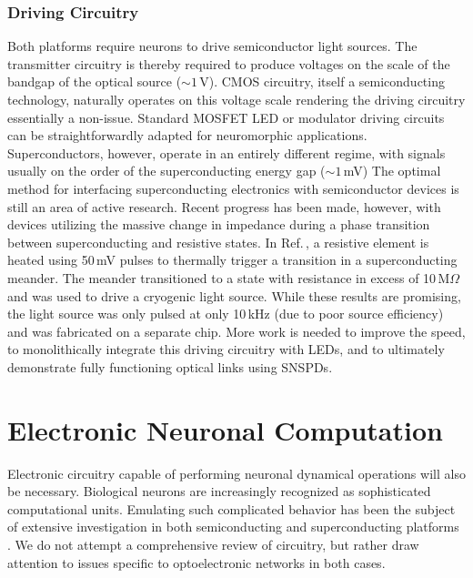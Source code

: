 \documentclass[twocolumn]{article}
\begin{document}
\subsubsection{Driving Circuitry}
Both platforms require neurons to drive semiconductor light sources. The transmitter circuitry is thereby required to produce voltages on the scale of the bandgap of the optical source ($\sim 1$\,V). CMOS circuitry, itself a semiconducting technology, naturally operates on this voltage scale rendering the driving circuitry essentially a non-issue. Standard MOSFET LED or modulator driving circuits \cite{bowers2016recent,LED reference?} can be straightforwardly adapted for neuromorphic applications. Superconductors, however, operate in an entirely different regime, with signals usually on the order of the superconducting energy gap ($\sim 1$\,mV) The optimal method for interfacing superconducting electronics with semiconductor devices is still an area of active research. Recent progress has been made, however, with devices utilizing the massive change in impedance during a phase transition between superconducting and resistive states. In Ref.\,\cite{mccaughan2019superconducting}, a resistive element is heated using 50\,mV pulses to thermally trigger a transition in a superconducting meander. The meander transitioned to a state with resistance in excess of 10\,M$\Omega$ and was used to drive a cryogenic light source. While these results are promising, the light source was only pulsed at only 10\,kHz (due to poor source efficiency) and was fabricated on a separate chip. More work is needed to improve the speed, to monolithically integrate this driving circuitry with LEDs, and to ultimately demonstrate fully functioning optical links using SNSPDs.

\section{\label{sec:soma}Electronic Neuronal Computation}
Electronic circuitry capable of performing neuronal dynamical operations will also be necessary. Biological neurons are increasingly recognized as sophisticated computational units. Emulating such complicated behavior has been the subject of extensive investigation in both semiconducting \cite{} and superconducting platforms \cite{}. We do not attempt a comprehensive review of circuitry, but rather draw attention to issues specific to optoelectronic networks in both cases.
\end{document}
